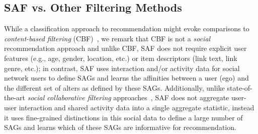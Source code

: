\subsection{SAF vs. Other Filtering Methods}

While a classification approach to recommendation might evoke
comparisons to \emph{content-based filtering} (CBF)~\cite{newsweeder},
we remark that CBF is not a \emph{social} recommendation approach and
unlike CBF, SAF does not require explicit user features (e.g., age,
gender, location, etc.) or item descriptors (link text, link genre,
etc.); in contrast, SAF uses interaction and/or activity data for
social network users to define SAGs and learns the affinities between
a user (ego) and the different set of alters as defined by these SAGs.
Additionally, unlike state-of-the-art \emph{social collaborative filtering} 
approaches~\cite{socinf,rrmf,ste,sorec,sr,Noel2012NOF,lla}, SAF does
not aggregate user-user interaction and shared activity data into a
single aggregate statistic, instead it uses fine-grained distinctions
in this social data to define a large number of SAGs and learns which
of these SAGs are informative for recommendation.


